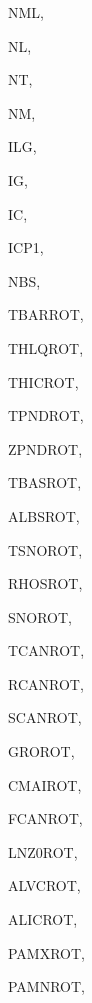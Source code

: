{\begin{DoxyParamCaption}
\item[{integer}]{N\+M\+L, }
\item[{integer}]{N\+L, }
\item[{integer}]{N\+T, }
\item[{integer}]{N\+M, }
\item[{integer}]{I\+L\+G, }
\item[{integer}]{I\+G, }
\item[{integer}]{I\+C, }
\item[{integer}]{I\+C\+P1, }
\item[{integer}]{N\+B\+S, }
\item[{real, dimension(nl,nt,ig)}]{T\+B\+A\+R\+R\+O\+T, }
\item[{real, dimension(nl,nt,ig)}]{T\+H\+L\+Q\+R\+O\+T, }
\item[{real, dimension(nl,nt,ig)}]{T\+H\+I\+C\+R\+O\+T, }
\item[{real, dimension(nl,nt)}]{T\+P\+N\+D\+R\+O\+T, }
\item[{real, dimension(nl,nt)}]{Z\+P\+N\+D\+R\+O\+T, }
\item[{real, dimension(nl,nt)}]{T\+B\+A\+S\+R\+O\+T, }
\item[{real, dimension(nl,nm)}]{A\+L\+B\+S\+R\+O\+T, }
\item[{real, dimension(nl,nm)}]{T\+S\+N\+O\+R\+O\+T, }
\item[{real, dimension(nl,nm)}]{R\+H\+O\+S\+R\+O\+T, }
\item[{real, dimension (nl,nm)}]{S\+N\+O\+R\+O\+T, }
\item[{real, dimension(nl,nt)}]{T\+C\+A\+N\+R\+O\+T, }
\item[{real, dimension(nl,nt)}]{R\+C\+A\+N\+R\+O\+T, }
\item[{real, dimension(nl,nt)}]{S\+C\+A\+N\+R\+O\+T, }
\item[{real, dimension (nl,nt)}]{G\+R\+O\+R\+O\+T, }
\item[{real, dimension(nl,nt)}]{C\+M\+A\+I\+R\+O\+T, }
\item[{real, dimension(nl,nt,icp1)}]{F\+C\+A\+N\+R\+O\+T, }
\item[{real, dimension(nl,nt,icp1)}]{L\+N\+Z0\+R\+O\+T, }
\item[{real, dimension(nl,nt,icp1)}]{A\+L\+V\+C\+R\+O\+T, }
\item[{real, dimension(nl,nt,icp1)}]{A\+L\+I\+C\+R\+O\+T, }
\item[{real, dimension(nl,nt,ic)}]{P\+A\+M\+X\+R\+O\+T, }
\item[{real, dimension(nl,nt,ic)}]{P\+A\+M\+N\+R\+O\+T, }

\end{DoxyParamCaption}}
